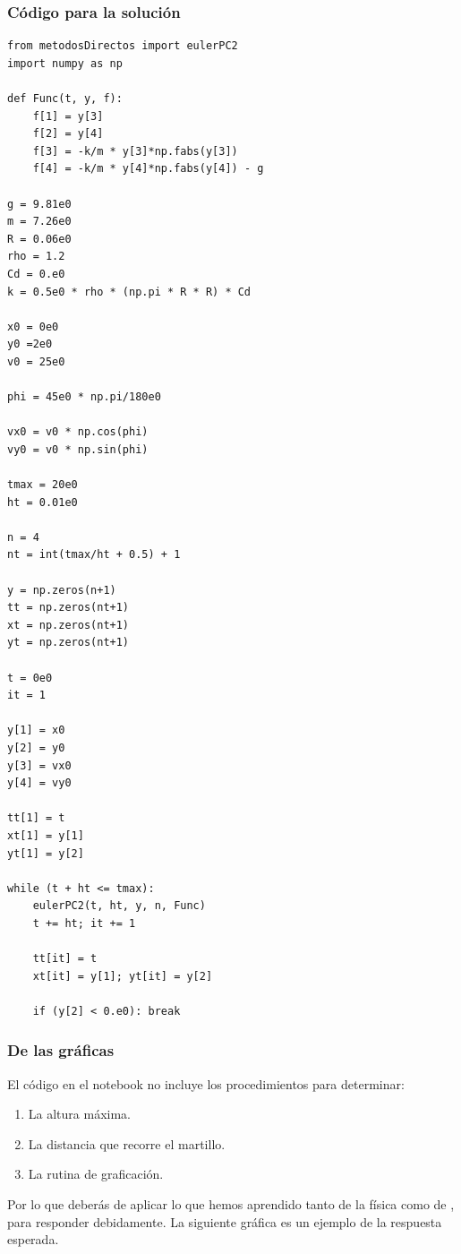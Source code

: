 \documentclass[12pt]{beamer}
\begin{document}
\begin{frame}
\frametitle{Código para la solución}
\begin{lstlisting}[caption=Código con el método Corrector-Predictor de Euler]
from metodosDirectos import eulerPC2
import numpy as np

def Func(t, y, f):
    f[1] = y[3]
    f[2] = y[4]
    f[3] = -k/m * y[3]*np.fabs(y[3])
    f[4] = -k/m * y[4]*np.fabs(y[4]) - g

g = 9.81e0
m = 7.26e0
R = 0.06e0
rho = 1.2
Cd = 0.e0
k = 0.5e0 * rho * (np.pi * R * R) * Cd

x0 = 0e0
y0 =2e0
v0 = 25e0

phi = 45e0 * np.pi/180e0

vx0 = v0 * np.cos(phi)
vy0 = v0 * np.sin(phi)

tmax = 20e0
ht = 0.01e0

n = 4
nt = int(tmax/ht + 0.5) + 1

y = np.zeros(n+1)
tt = np.zeros(nt+1)
xt = np.zeros(nt+1)
yt = np.zeros(nt+1)

t = 0e0
it = 1

y[1] = x0 
y[2] = y0
y[3] = vx0
y[4] = vy0

tt[1] = t
xt[1] = y[1]
yt[1] = y[2]

while (t + ht <= tmax):
    eulerPC2(t, ht, y, n, Func)
    t += ht; it += 1
   
    tt[it] = t
    xt[it] = y[1]; yt[it] = y[2]
   
    if (y[2] < 0.e0): break
\end{lstlisting}
\end{frame}
\begin{frame}
\frametitle{De las gráficas}
El código en el notebook no incluye los procedimientos para determinar:
\begin{enumerate}[<+->]
\item La altura máxima.
\item La distancia que recorre el martillo.
\item La rutina de graficación.
\end{enumerate}
\pause
Por lo que deberás de aplicar lo que hemos aprendido tanto de la física como de \python, para responder debidamente. La siguiente gráfica es un ejemplo de la respuesta esperada.
\end{frame}
\end{document}
